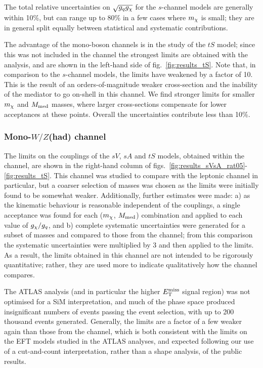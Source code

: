 The total relative uncertainties on $\sqrt{g_q g_{\chi}}$ for the $s$-channel models are generally within 10\%, but can range up to 80\% in a few cases where $m_{\chi}$ is small; they are in general split equally between statistical and systematic contributions.

The advantage of the mono-boson channels is in the study of the $tS$ model; since this was not included in the \monojet channel the strongest limits are obtained with the \monoZ analysis, and are shown in the left-hand side of fig.~\ref{fig:results_tS}. Note that, in comparison to the $s$-channel models, the limits have weakened by a factor of 10. This is the result of an orders-of-magnitude weaker cross-section and the inability of the mediator to go on-shell in this channel. We find stronger limits for smaller $m_{\chi}$ and $M_{\mathrm{med}}$ masses, where larger cross-sections compensate for lower acceptances at these points. Overall the uncertainties contribute less than 10\%.

\subsubsection{Mono-$W/Z$(had) channel}

The limits on the couplings of the $sV$, $sA$ and $tS$ models, obtained within the \monoWZ channel, are shown in the right-hand column of figs.~\ref{fig:results_sVsA_rat05}-\ref{fig:results_tS}. This channel was studied to compare with the leptonic \monoZ channel in particular, but a coarser selection of masses was chosen as the limits were initially found to be somewhat weaker. Additionally, further estimates were made: a) as the kinematic behaviour is reasonable independent of the couplings, a single acceptance was found for each ($m_{\chi}$, $M_{\mathrm{med}}$) combination and applied to each value of $g_{\chi} / g_q$, and b) complete systematic uncertainties were generated for a subset of masses and compared to those from the \monoZ channel; from this comparison the \monoZ systematic uncertainties were multiplied by 3 and then applied to the \monoWZ limits. As a result, the limits obtained in this channel are not intended to be rigorously quantitative; rather, they are used more to indicate qualitatively how the channel compares.

The ATLAS \monoWZ analysis (and in particular the higher $E_{\mathrm{T}}^{\mathrm{miss}}$ signal region) was not optimised for a SiM interpretation, and much of the phase space produced insignificant numbers of events passing the event selection, with up to 200 thousand events generated. Generally, the limits are a factor of a few weaker again than those from the \monoZ channel, which is both consistent with the limits on the EFT models studied in the ATLAS analyses, and expected following our use of a cut-and-count interpretation, rather than a shape analysis, of the \monoWZ public results.

